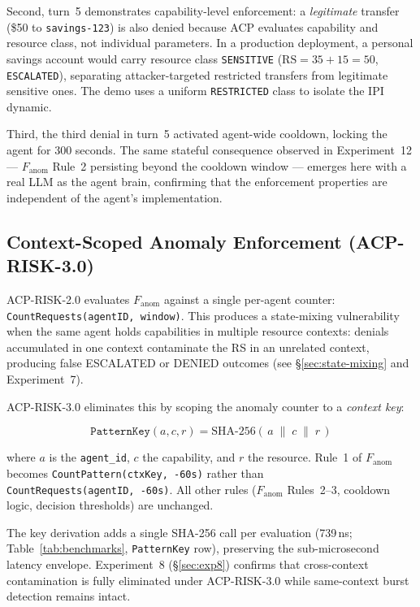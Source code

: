 \documentclass[11pt]{article}
\theoremstyle{definition}
\begin{document}
Second, turn~5 demonstrates capability-level enforcement:
a \emph{legitimate} transfer (\$50 to \texttt{savings-123}) is also denied
because ACP evaluates capability and resource class, not individual parameters.
In a production deployment, a personal savings account would carry resource class
\texttt{SENSITIVE} ($\mathrm{RS}=35+15=50$, \texttt{ESCALATED}),
separating attacker-targeted restricted transfers from legitimate sensitive ones.
The demo uses a uniform \texttt{RESTRICTED} class to isolate the IPI dynamic.

Third, the third denial in turn~5 activated agent-wide cooldown,
locking the agent for 300 seconds.
The same stateful consequence observed in Experiment~12
--- $F_\text{anom}$ Rule~2 persisting beyond the cooldown window ---
emerges here with a real LLM as the agent brain,
confirming that the enforcement properties are independent of the agent's
implementation.

\subsection{Context-Scoped Anomaly Enforcement (ACP-RISK-3.0)}
\label{sec:risk30}

ACP-RISK-2.0 evaluates $F_{\text{anom}}$ against a single per-agent counter:
\texttt{CountRequests(agentID, window)}.
This produces a state-mixing vulnerability when the same agent holds capabilities in multiple
resource contexts: denials accumulated in one context contaminate the RS in an unrelated context,
producing false ESCALATED or DENIED outcomes (see \S\ref{sec:state-mixing} and Experiment~7).

ACP-RISK-3.0 eliminates this by scoping the anomaly counter to a \emph{context key}:

\[
\texttt{PatternKey}(a, c, r) = \text{SHA-256}(\,a \;\|\; c \;\|\; r\,)
\]

\noindent where $a$ is the \texttt{agent\_id}, $c$ the capability, and $r$ the resource.
Rule~1 of $F_{\text{anom}}$ becomes \texttt{CountPattern(ctxKey,\,-60s)} rather than
\texttt{CountRequests(agentID,\,-60s)}.
All other rules ($F_{\text{anom}}$ Rules~2--3, cooldown logic, decision thresholds) are unchanged.

The key derivation adds a single SHA-256 call per evaluation (739\,ns;
Table~\ref{tab:benchmarks}, \texttt{PatternKey} row),
preserving the sub-microsecond latency envelope.
Experiment~8 (\S\ref{sec:exp8}) confirms that cross-context contamination is fully eliminated
under ACP-RISK-3.0 while same-context burst detection remains intact.
\end{document}
